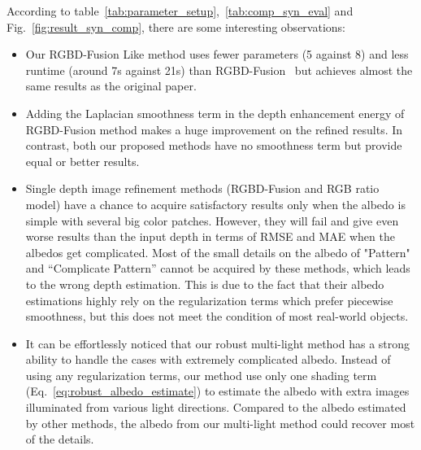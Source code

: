 According to table~\ref{tab:parameter_setup},~\ref{tab:comp_syn_eval} and Fig.~\ref{fig:result_syn_comp}, there are some interesting observations:
\begin{itemize}
    \item Our RGBD-Fusion Like method uses fewer parameters (5 against 8) and less runtime (around 7s against 21s) than RGBD-Fusion~\cite{or2015rgbd} but achieves almost the same results as the original paper.
    \item Adding the Laplacian smoothness term in the depth enhancement energy of RGBD-Fusion method makes a huge improvement on the refined results. In contrast, both our proposed methods have no smoothness term but provide equal or better results.
    \item Single depth image refinement methods (RGBD-Fusion and RGB ratio model) have a chance to acquire satisfactory results only when the albedo is simple with several big color patches. 
    However, they will fail and give even worse results than the input depth in terms of RMSE and MAE when the albedos get complicated. 
    Most of the small details on the albedo of "Pattern" and ``Complicate Pattern'' cannot be acquired by these methods, which leads to the wrong depth estimation.
    This is due to the fact that their albedo estimations highly rely on the regularization terms which prefer piecewise smoothness, but this does not meet the condition of most real-world objects.
    \item It can be effortlessly noticed that our robust multi-light method has a strong ability to handle the cases with extremely complicated albedo. 
    Instead of using any regularization terms, our method use only one shading term (Eq.~\ref{eq:robust_albedo_estimate}) to estimate the albedo with extra images illuminated from various light directions. 
    Compared to the albedo estimated by other methods, the albedo from our multi-light method could recover most of the details.
\end{itemize}




